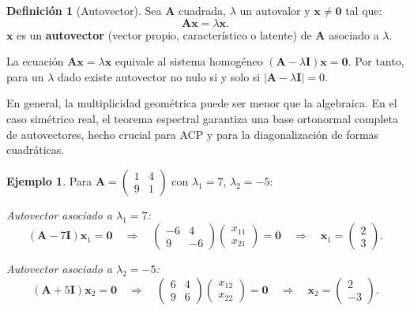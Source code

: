 \documentclass[12pt, a4paper]{article}
\theoremstyle{plain}
\theoremstyle{definition}
\newtheorem{definicion}[teorema]{Definición}
\newtheorem{ejemplo}{Ejemplo}[section]
\theoremstyle{remark}
\newcommand{\mat}[1]{\mathbf{#1}}
\begin{document}
\begin{definicion}[Autovector]
Sea $\mat{A}$ cuadrada, $\lambda$ un autovalor y $\mathbf{x}\neq\mathbf{0}$
tal que:
\[
  \mat{A}\mathbf{x} = \lambda\mathbf{x}.
\]
$\mathbf{x}$ es un \textbf{autovector} (vector propio, característico o latente)
de $\mat{A}$ asociado a $\lambda$.
\end{definicion}

La ecuación $\mat{A}\mathbf{x} = \lambda\mathbf{x}$ equivale al sistema
homogéneo $(\mat{A}-\lambda\mat{I})\mathbf{x}=\mathbf{0}$. Por tanto, para un
$\lambda$ dado existe autovector no nulo si y solo si
$|\mat{A}-\lambda\mat{I}|=0$.

En general, la multiplicidad geométrica puede ser menor que la algebraica. En
el caso simétrico real, el teorema espectral garantiza una base ortonormal
completa de autovectores, hecho crucial para ACP y para la diagonalización de
formas cuadráticas.

\begin{ejemplo}
Para $\mat{A} = \begin{pmatrix}1&4\\9&1\end{pmatrix}$ con
$\lambda_1=7$, $\lambda_2=-5$:

\textit{Autovector asociado a $\lambda_1=7$:}
\[
  (\mat{A}-7\mat{I})\mathbf{x}_1 = \mathbf{0}
  \quad\Longrightarrow\quad
  \begin{pmatrix}-6&4\\9&-6\end{pmatrix}\begin{pmatrix}x_{11}\\x_{21}\end{pmatrix}=\mathbf{0}
  \quad\Longrightarrow\quad
  \mathbf{x}_1 = \begin{pmatrix}2\\3\end{pmatrix}.
\]

\textit{Autovector asociado a $\lambda_2=-5$:}
\[
  (\mat{A}+5\mat{I})\mathbf{x}_2 = \mathbf{0}
  \quad\Longrightarrow\quad
  \begin{pmatrix}6&4\\9&6\end{pmatrix}\begin{pmatrix}x_{12}\\x_{22}\end{pmatrix}=\mathbf{0}
  \quad\Longrightarrow\quad
  \mathbf{x}_2 = \begin{pmatrix}2\\-3\end{pmatrix}.
\]
\end{ejemplo}
\end{document}
